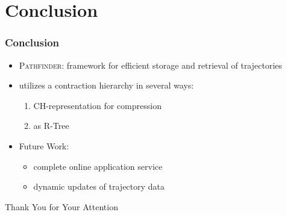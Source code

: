 \documentclass[10pt, t,
aspectratio=1610,%
usenames,
dvipsnames,
]{beamer}
\newcommand{\pathfinder}{\textsc{Pathfinder}\xspace}
\newcommand{\chrep}{CH-representation\xspace}
\begin{document}
\section{Conclusion}
\begin{frame}
	\frametitle{Conclusion}
	\begin{itemize}
		\item \pathfinder: framework for efficient storage and retrieval of trajectories \pause
		\item utilizes a contraction hierarchy in several ways: \pause
		      \begin{enumerate}
			      \item \chrep for compression \pause
			      \item as R-Tree \pause
		      \end{enumerate}
		\item Future Work: \pause
		      \begin{itemize}
			      \item complete online application service \pause
			      \item dynamic updates of trajectory data \pause
		      \end{itemize}
	\end{itemize}
	\bigskip
	\bigskip
	\centering \Huge Thank You for Your Attention

\end{frame}


\end{document}

